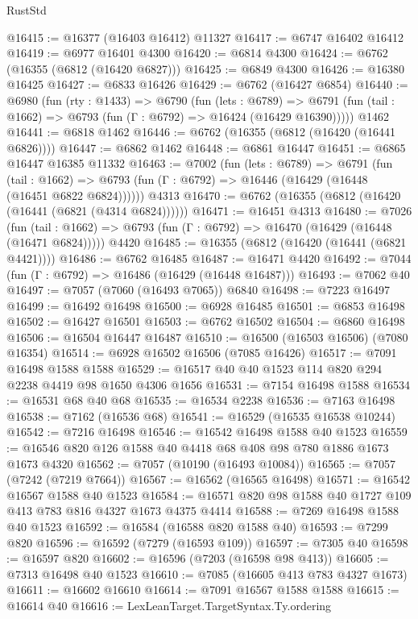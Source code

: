 \begin{lexlean}{RustStd}
\begin{coremodule}
@16415 := @16377 (@16403 @16412) @11327
@16417 := @6747 @16402 @16412
@16419 := @6977 @16401 @4300
@16420 := @6814 @4300
@16424 := @6762 (@16355 (@6812 (@16420 @6827)))
@16425 := @6849 @4300
@16426 := @16380 @16425
@16427 := @6833 @16426
@16429 := @6762 (@16427 @6854)
@16440 := @6980
    (fun (rty : @1433) =>
    @6790
      (fun (lets : @6789) =>
      @6791 (fun (tail : @1662) => @6793 (fun (Γ : @6792) => @16424 (@16429 @16390)))))
    @1462
@16441 := @6818 @1462
@16446 := @6762 (@16355 (@6812 (@16420 (@16441 @6826))))
@16447 := @6862 @1462
@16448 := @6861 @16447
@16451 := @6865 @16447 @16385 @11332
@16463 := @7002
    (fun (lets : @6789) =>
    @6791
      (fun (tail : @1662) =>
      @6793 (fun (Γ : @6792) => @16446 (@16429 (@16448 (@16451 @6822 @6824))))))
    @4313
@16470 := @6762 (@16355 (@6812 (@16420 (@16441 (@6821 (@4314 @6824))))))
@16471 := @16451 @4313
@16480 := @7026
    (fun (tail : @1662) => @6793 (fun (Γ : @6792) => @16470 (@16429 (@16448 (@16471 @6824)))))
    @4420
@16485 := @16355 (@6812 (@16420 (@16441 (@6821 @4421))))
@16486 := @6762 @16485
@16487 := @16471 @4420
@16492 := @7044 (fun (Γ : @6792) => @16486 (@16429 (@16448 @16487)))
@16493 := @7062 @40
@16497 := @7057 (@7060 (@16493 @7065)) @6840
@16498 := @7223 @16497
@16499 := @16492 @16498
@16500 := @6928 @16485
@16501 := @6853 @16498
@16502 := @16427 @16501
@16503 := @6762 @16502
@16504 := @6860 @16498
@16506 := @16504 @16447 @16487
@16510 := @16500 (@16503 @16506) (@7080 @16354)
@16514 := @6928 @16502 @16506 (@7085 @16426)
@16517 := @7091 @16498 @1588 @1588
@16529 := @16517 @40 @40 @1523 @114 @820 @294 @2238 @4419 @98 @1650 @4306 @1656
@16531 := @7154 @16498 @1588
@16534 := @16531 @68 @40 @68
@16535 := @16534 @2238
@16536 := @7163 @16498
@16538 := @7162 (@16536 @68)
@16541 := @16529 (@16535 @16538 @10244)
@16542 := @7216 @16498
@16546 := @16542 @16498 @1588 @40 @1523
@16559 := @16546 @820 @126 @1588 @40 @4418 @68 @408 @98 @780 @1886 @1673 @1673 @4320
@16562 := @7057 (@10190 (@16493 @10084))
@16565 := @7057 (@7242 (@7219 @7664))
@16567 := @16562 (@16565 @16498)
@16571 := @16542 @16567 @1588 @40 @1523
@16584 := @16571 @820 @98 @1588 @40 @1727 @109 @413 @783 @816 @4327 @1673 @4375 @4414
@16588 := @7269 @16498 @1588 @40 @1523
@16592 := @16584 (@16588 @820 @1588 @40)
@16593 := @7299 @820
@16596 := @16592 (@7279 (@16593 @109))
@16597 := @7305 @40
@16598 := @16597 @820
@16602 := @16596 (@7203 (@16598 @98 @413))
@16605 := @7313 @16498 @40 @1523
@16610 := @7085 (@16605 @413 @783 @4327 @1673)
@16611 := @16602 @16610
@16614 := @7091 @16567 @1588 @1588
@16615 := @16614 @40
@16616 := LexLeanTarget.TargetSyntax.Ty.ordering

\end{coremodule}
\end{lexlean}
